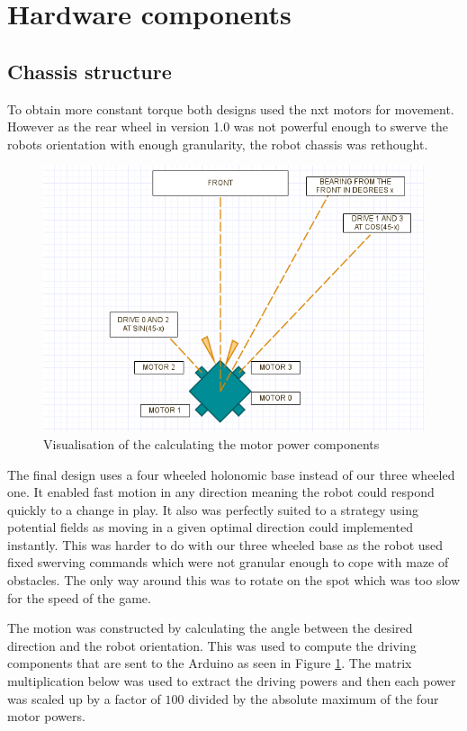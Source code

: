 \documentclass[a4paper,12pt]{article}
\begin{document}
\section{Hardware components}

\subsection{Chassis structure}

To obtain more constant torque both designs used the nxt motors for movement. However as the rear wheel in version 1.0 was not powerful enough to swerve the robots orientation with enough granularity, the robot chassis was rethought.

\begin{figure}
  \centering
\includegraphics[scale=.4]{holonomics.png}
\caption{Visualisation of the calculating the motor power components}
\label{fig:components}
\end{figure}  

The final design uses a four wheeled holonomic base instead of our three wheeled one. It enabled fast motion in any direction meaning the robot could respond quickly to a change in play. It also was perfectly suited to a strategy using potential fields as moving in a given optimal direction could implemented instantly. This was harder to do with our three wheeled base as the robot used fixed swerving commands which were not granular enough to cope with maze of obstacles. The only way around this was to rotate on the spot which was too slow for the speed of the game.

The motion was constructed by calculating the angle between the desired direction  and the robot orientation. This was used to compute the driving components that are sent to the Arduino as seen in Figure \ref{fig:components}. The matrix multiplication below was used to extract the driving powers and then each power was scaled up by a factor of $100$ divided by the absolute maximum of the four motor powers.
\end{document}
